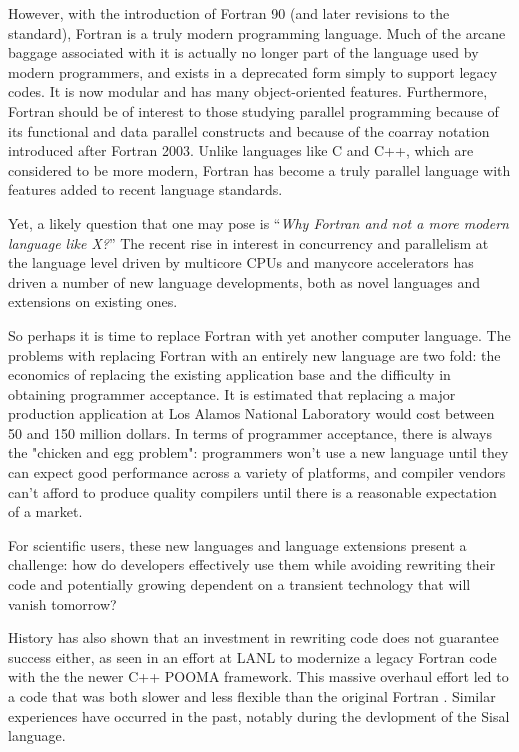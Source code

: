 \documentclass[10pt, conference, compsocconf]{IEEEtran}
\begin{document}
However, with the introduction of Fortran 90 (and later revisions to the
standard), Fortran is a truly modern programming language. Much of the arcane
baggage associated with it is actually no longer part of the language used by
modern programmers, and exists in a deprecated form simply to support legacy
codes. It is now modular and has many object-oriented features. Furthermore,
Fortran should be of interest to those studying parallel programming because
of its functional and data parallel constructs and because of the coarray
notation introduced after Fortran 2003. Unlike languages like C and C++, which
are considered to be more modern, Fortran has become a truly parallel language
with features added to recent language standards.

Yet, a likely question that one may pose is ``\emph{Why Fortran and not a more
  modern language like X?}''  The recent rise in interest in concurrency and
parallelism at the language level driven by multicore CPUs and manycore
accelerators has driven a number of new language developments, both as novel
languages and extensions on existing ones.

So perhaps it is time to replace Fortran with yet another computer language.  The
problems with replacing Fortran with an entirely new language are two fold:
the economics of replacing the existing application base and the difficulty in
obtaining programmer acceptance.  It is estimated that replacing a major
production application at Los Alamos National Laboratory would cost between 50
and 150 million dollars.  In terms of programmer acceptance, there is always
the "chicken and egg problem": programmers won't use a new language until they
can expect good performance across a variety of platforms, and compiler
vendors can't afford to produce quality compilers until there is a reasonable
expectation of a market.

For scientific users, these new languages and language extensions
present a challenge: how do developers effectively use them while
avoiding rewriting their code and potentially growing dependent on a
transient technology that will vanish tomorrow?

History has also shown that an investment in rewriting code does not guarantee
success either, as seen in an effort at LANL to modernize a legacy Fortran
code with the the newer C++ POOMA framework.  This massive overhaul effort led
to a code that was both slower and less flexible than the original Fortran
\cite{}.  Similar experiences have occurred in the past, notably during the
devlopment of the Sisal language.
\end{document}
